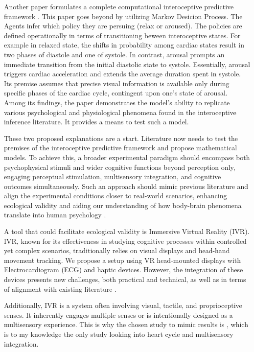 \documentclass[12pt,oneside,openright]{report}
\begin{document}
Another paper formulates a complete computational interoceptive predictive framework \parencite{Allen2022}. This paper goes beyond by utilizing Markov Desicion Process. The Agents infer which policy they are persuing (relax or aroused). The policies are defined operationally in terms of transitioning beween interoceptive states. For example in relaxed state, the shifts in probability among cardiac states result in two phases of diastole and one of systole. In contrast, arousal prompts an immediate transition from the initial diastolic state to systole. Essentially, arousal triggers cardiac acceleration and extends the average duration spent in systole. Its premise assumes that precise visual information is available only during specific phases of the cardiac cycle, contingent upon one's state of arousal. Among its findings, the paper demonstrates the model's ability to replicate various psychological and physiological phenomena found in the interoceptive inference literature. It provides a means to test such a model.

These two proposed explanations are a start. Literature now needs to test the premises of the interoceptive predictive framework and propose mathematical models. To achieve this, a broader experimental paradigm should encompass both psychophysical stimuli and wider cognitive functions beyond perception only, engaging perceptual stimulation, multisensory integration, and cognitive outcomes simultaneously. Such an approach should mimic previous literature and align the experimental conditions closer to real-world scenarios, enhancing ecological validity and aiding our understanding of how body-brain phenomena translate into human psychology \parencite{schmuckler2001ecological}.

A tool that could facilitate ecological validity is Immersive Virtual Reality (IVR). IVR, known for its effectiveness in studying cognitive processes within controlled yet complex scenarios, traditionally relies on visual displays and head-hand movement tracking. We propose a setup using VR head-mounted displays with Electrocardiogram (ECG) and haptic devices. However, the integration of these devices presents new challenges, both practical and technical, as well as in terms of alignment with existing literature \parencite{Klotzsche2023}. 

Additionally, IVR is a system often involving visual, tactile, and proprioceptive senses. It inherently engages multiple senses or is intentionally designed as a multisensory experience. This is why the chosen study to mimic results is \textcite{SALTAFOSSI2023108642}, which is to my knowledge the only study looking into heart cycle and multisensory integration. 
\end{document}
